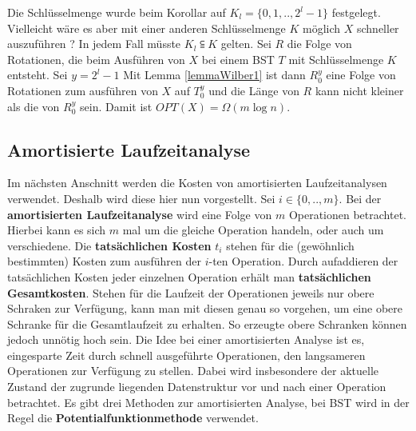 \documentclass[a4paper,12pt]{article}
\begin{document}
\noindent Die Schlüsselmenge  wurde beim Korollar auf ${K_l = \{0,1,..,2^l -1\}}$ festgelegt. Vielleicht wäre es aber mit einer anderen Schlüsselmenge $K$ möglich $X$ schneller auszuführen ? In jedem Fall müsste $K_l \subseteqq K$ gelten. Sei $R$ die Folge von Rotationen, die beim Ausführen von $X$ bei einem BST $T$ mit Schlüsselmenge $K$ entsteht. Sei $y = 2^l -1$ Mit Lemma \ref{lemmaWilber1} ist dann $R_0^y$ eine Folge von Rotationen zum ausführen von $X$ auf $T_0^y$ und die Länge von $R$ kann nicht kleiner als die von $R_0^y$ sein. Damit ist $\mathit{OPT}\left(X\right) = \Omega\left(m \log n \right)$. 



\subsection{Amortisierte Laufzeitanalyse}
Im nächsten Anschnitt werden die Kosten von amortisierten Laufzeitanalysen verwendet. Deshalb wird diese hier nun vorgestellt.
Sei $i \in \{0,..,m\}$. Bei der \textbf{amortisierten Laufzeitanalyse} wird eine Folge von $m$ Operationen betrachtet. Hierbei kann es sich $m$ mal um die gleiche Operation handeln, oder auch um verschiedene. Die \textbf{tatsächlichen Kosten}  $t_i$ stehen für die (gewöhnlich bestimmten) Kosten zum ausführen der $i$-ten Operation. Durch aufaddieren der tatsächlichen Kosten jeder einzelnen Operation erhält man \textbf{tatsächlichen Gesamtkosten}.  Stehen für die Laufzeit der Operationen jeweils nur obere Schraken zur Verfügung, kann man mit diesen genau so vorgehen, um eine obere Schranke für die Gesamtlaufzeit zu erhalten. So erzeugte obere Schranken können jedoch unnötig hoch sein. Die Idee bei einer amortisierten Analyse ist es, eingesparte Zeit durch schnell ausgeführte Operationen, den langsameren Operationen zur Verfügung zu stellen. Dabei wird insbesondere der aktuelle Zustand der zugrunde liegenden Datenstruktur vor und nach einer Operation betrachtet. Es gibt drei Methoden zur amortisierten Analyse, bei BST wird in der Regel die \textbf{Potentialfunktionmethode} verwendet.
\end{document}
